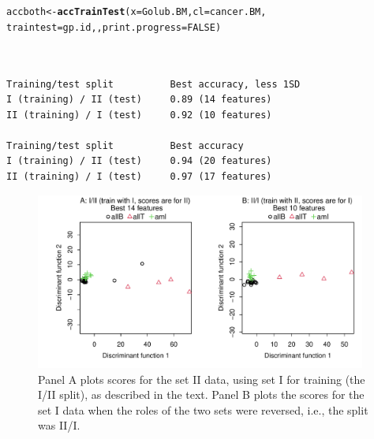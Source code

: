 \documentclass{article}\usepackage[]{graphicx}\usepackage[]{xcolor}
\makeatletter
\newcommand{\hlnum}[1]{\textcolor[rgb]{0.686,0.059,0.569}{#1}}%
\newcommand{\hlstd}[1]{\textcolor[rgb]{0.345,0.345,0.345}{#1}}%
\newcommand{\hlkwb}[1]{\textcolor[rgb]{0.69,0.353,0.396}{#1}}%
\newcommand{\hlkwc}[1]{\textcolor[rgb]{0.333,0.667,0.333}{#1}}%
\newcommand{\hlkwd}[1]{\textcolor[rgb]{0.737,0.353,0.396}{\textbf{#1}}}%
\newenvironment{kframe}{%
 \def\at@end@of@kframe{}%
 \ifinner\ifhmode%
  \def\at@end@of@kframe{\end{minipage}}%
  \begin{minipage}{\columnwidth}%
 \fi\fi%
 \def\FrameCommand##1{\hskip\@totalleftmargin \hskip-\fboxsep
 \colorbox{shadecolor}{##1}\hskip-\fboxsep
     \hskip-\linewidth \hskip-\@totalleftmargin \hskip\columnwidth}%
 \MakeFramed {\advance\hsize-\width
   \@totalleftmargin\z@ \linewidth\hsize
   \@setminipage}}%
 {\par\unskip\endMakeFramed%
 \at@end@of@kframe}
\newenvironment{knitrout}{}{} %
\makeatother
\begin{document}
\begin{knitrout}
\color{fgcolor}\begin{kframe}
\begin{alltt}
\hlstd{accboth} \hlkwb{<-} \hlkwd{accTrainTest}\hlstd{(}\hlkwc{x} \hlstd{= Golub.BM,} \hlkwc{cl} \hlstd{= cancer.BM,}
                        \hlkwc{traintest}\hlstd{=gp.id, ,} \hlkwc{print.progress}\hlstd{=}\hlnum{FALSE}\hlstd{)}
\end{alltt}
\begin{verbatim}

                                                      
Training/test split          Best accuracy, less 1SD  
I (training) / II (test)     0.89 (14 features)       
II (training) / I (test)     0.92 (10 features)       
                                               
Training/test split          Best accuracy     
I (training) / II (test)     0.94 (20 features)
II (training) / I (test)     0.97 (17 features)
\end{verbatim}
\end{kframe}
\end{knitrout}

\begin{figure}[h]
\begin{knitrout}
\color{fgcolor}

{\centering \includegraphics[width=0.97\textwidth]{figs/key-plot-train-test-1} 

}


\end{knitrout}
\caption{Panel A plots scores for the set II data, using set I for
  training (the I/II split), as described in the text. Panel B plots
  the scores for the set I data when the roles of the two sets
  were reversed, i.e., the split was II/I.}
\label{fig:traintest}
\end{figure}
\end{document}

